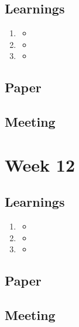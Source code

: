 \section{Learnings}
\begin{enumerate}
\item
\begin{itemize}
\item
\end{itemize}
\item
\begin{itemize}
\item
\end{itemize}
\item
\begin{itemize}
\item
\end{itemize}
\end{enumerate}

\section{Paper}

\section{Meeting}
\chapter{Week 12}

\section{Learnings}
\begin{enumerate}
\item
\begin{itemize}
\item
\end{itemize}
\item
\begin{itemize}
\item
\end{itemize}
\item
\begin{itemize}
\item
\end{itemize}
\end{enumerate}

\section{Paper}

\section{Meeting}


